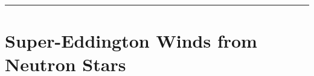 \documentclass[onecolumn]{aastex63}
\begin{document}

\vspace{1cm}
\hrule
\vspace{1cm}

\section{Super-Eddington Winds from Neutron Stars}
\begin{centering}

\cite{paczynski1990}

\end{centering}
\end{document}
